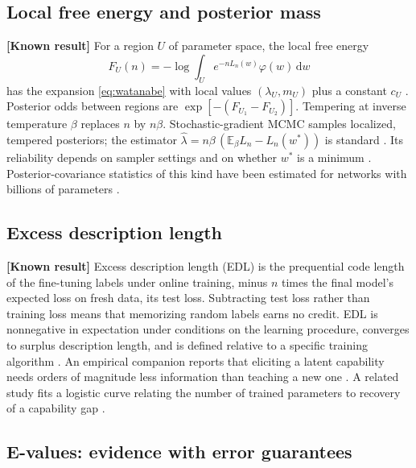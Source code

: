 \documentclass[11pt,a4paper]{article}
\newcommand{\E}{\mathbb E}
\newcommand{\dd}{\mathrm d}
\newcommand{\evl}[2]{{\small\bfseries\color{#1}[#2]}}
\newcommand{\LKnown}{\evl{cknown}{Known result}}
\begin{document}
\subsection{Local free energy and posterior mass}

\LKnown{} For a region $U$ of parameter space, the local free energy
\begin{equation*}
F_U(n)=-\log\int_U e^{-nL_n(w)}\varphi(w)\,\dd w
\end{equation*}
has the expansion
\eqref{eq:watanabe} with local values $(\lambda_U,m_U)$ plus a constant
$c_U$ \cite{watanabe2009}. Posterior odds between regions are
$\exp[-(F_{U_1}-F_{U_2})]$. Tempering at inverse temperature $\beta$
replaces $n$ by $n\beta$. Stochastic-gradient MCMC samples localized,
tempered posteriors; the estimator $\hat\lambda=n\beta\,(\E_\beta
L_n-L_n(w^*))$ is standard \cite{lau2025llc}. Its reliability depends
on sampler settings and on whether $w^*$ is a minimum
\cite{hitchcock2025,cai2026}. Posterior-covariance statistics of this
kind have been estimated for networks with billions of parameters
\cite{kreer2026}.

\subsection{Excess description length}

\LKnown{} Excess description length (EDL) is the prequential code length of the fine-tuning labels under online training, minus $n$ times the final model's expected loss on fresh data, its test loss. Subtracting test loss rather than training loss means that memorizing random labels earns no credit. EDL is nonnegative in expectation under conditions on the learning procedure, converges to surplus description length, and is defined relative to a specific training algorithm \cite{donoway2026}. An
empirical companion reports that eliciting a latent capability needs
orders of magnitude less information than teaching a new one
\cite{bitsthatcount2026}. A related study fits a logistic curve relating
the number of trained parameters to recovery of a capability gap
\cite{elicitation2025}.

\subsection{E-values: evidence with error guarantees}
\label{sec:evalues}
\end{document}
